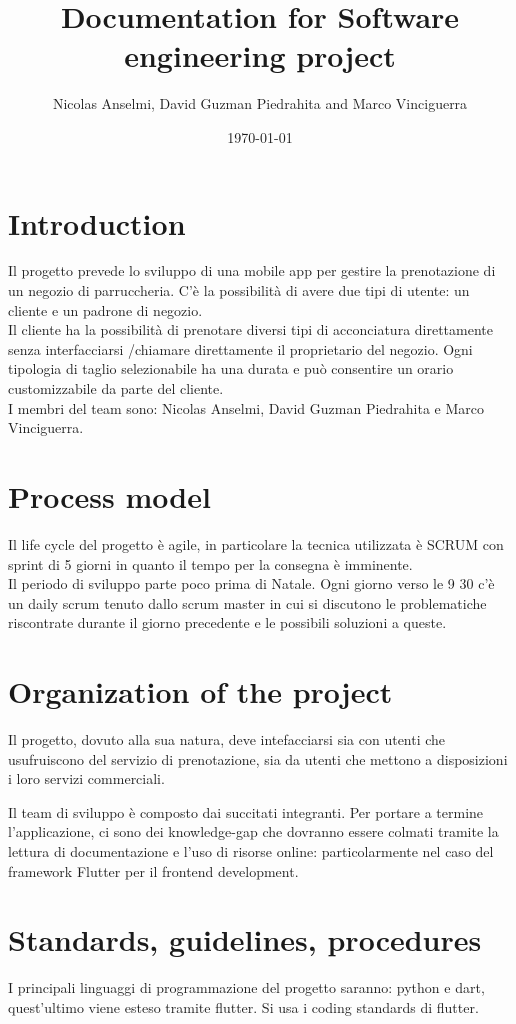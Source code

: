 \documentclass{article}
\title{Documentation for Software engineering project}
\author{Nicolas Anselmi, David Guzman Piedrahita and Marco Vinciguerra}
\date{\today}
\begin{document}
\maketitle

\section{Introduction}
Il progetto prevede lo sviluppo di una mobile app per gestire la prenotazione di 
un negozio di parruccheria. C'è la possibilità di avere due tipi di utente:
un cliente e un padrone di negozio.\\
Il cliente ha la possibilità di prenotare diversi 
tipi di acconciatura direttamente senza interfacciarsi /chiamare direttamente il proprietario
del negozio. Ogni tipologia di taglio selezionabile ha una durata e può consentire un orario customizzabile 
da parte del cliente. \\
I membri del team sono: Nicolas Anselmi, David Guzman Piedrahita e Marco Vinciguerra.

\section{Process model}
Il life cycle del progetto è agile, in particolare la tecnica utilizzata è SCRUM con
sprint di 5 giorni in quanto il tempo per la consegna è imminente. \\
Il periodo di sviluppo parte
poco prima di Natale. Ogni giorno verso le 9 30 
c'è un daily scrum tenuto dallo scrum master in cui si discutono le problematiche riscontrate durante 
il giorno precedente e le possibili soluzioni a queste.

\section{Organization of the project}
Il progetto, dovuto alla sua natura, deve intefacciarsi sia con utenti  che usufruiscono del servizio di prenotazione, sia da utenti che mettono a disposizioni i loro servizi commerciali.

Il team di sviluppo è composto dai succitati integranti. Per portare a termine l'applicazione, ci sono dei knowledge-gap che dovranno essere colmati tramite la lettura di documentazione e l'uso di risorse online: particolarmente nel caso del framework Flutter per il frontend development.


\section{Standards, guidelines, procedures}
I principali linguaggi di programmazione del progetto saranno: python e dart, quest'ultimo
viene esteso tramite flutter.
Si usa i coding standards di flutter.
\end{document}
